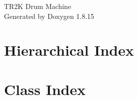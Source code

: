 \let\mypdfximage\pdfximage\def\pdfximage{\immediate\mypdfximage}\documentclass[twoside]{book}
\newcommand{\+}{\discretionary{\mbox{\scriptsize$\hookleftarrow$}}{}{}}
\newcommand{\clearemptydoublepage}{%
  \newpage{\pagestyle{empty}\cleardoublepage}%
}
\begin{document}
\hypersetup{pageanchor=false,
             bookmarksnumbered=true,
             pdfencoding=unicode
            }
\begin{titlepage}
\vspace*{7cm}
\begin{center}%
{\Large T\+R2K Drum Machine }\\
\vspace*{1cm}
{\large Generated by Doxygen 1.8.15}\\
\end{center}
\end{titlepage}
\clearemptydoublepage
{}
\tableofcontents
\clearemptydoublepage
{}
\hypersetup{pageanchor=true}

\chapter{Hierarchical Index}

\chapter{Class Index}

\end{document}
